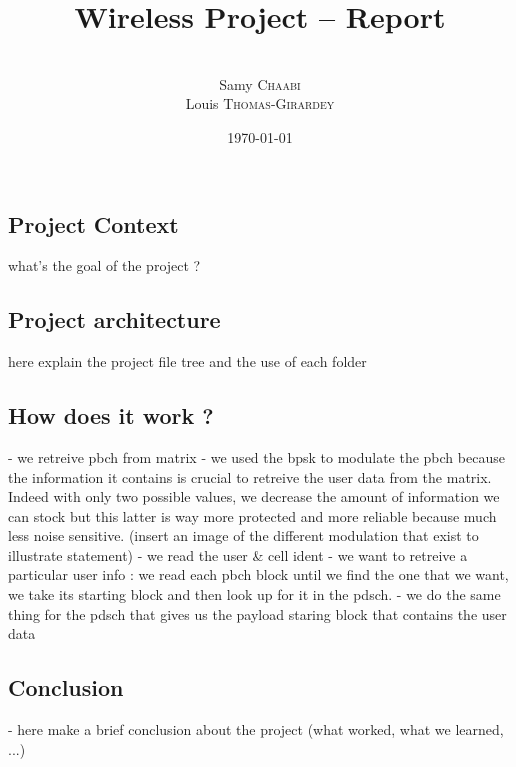 \documentclass[a4paper, 12pt, twoside]{article}
\title{Wireless Project -- Report}
\author{
    \\ Samy \textsc{Chaabi}
    \\ Louis \textsc{Thomas-Girardey}
}
\date{
    \today
    \\
    $\phantom{a}$
}
\begin{document}
    
    \maketitle

    \newpage
    
    \tableofcontents
    \listoffigures
    \listoftables
    \listofalgorithms
    \newpage


    \begin{indt}{\section{Project Context}} %
        what's the goal of the project ?
    \end{indt}

    \begin{indt}{\section{Project architecture}}
        here explain the project file tree and the use of each folder
    \end{indt}

    \begin{indt}{\section{How does it work ?}}
        - we retreive pbch from matrix
        - we used the bpsk to modulate the pbch because the information it contains is crucial to retreive the user data from the matrix. Indeed with only two possible values, we decrease the amount of information we can stock but this latter is way more protected and more reliable because much less noise sensitive. (insert an image of the different modulation that exist to illustrate statement)
        - we read the user & cell ident
        - we want to retreive a particular user info : we read each pbch block until we find the one that we want, we take its starting block and then look up for it in the pdsch.
        - we do the same thing for the pdsch that gives us the payload staring block that contains the user data
    \end{indt}

    \begin{indt}{\section{Conclusion}}
        - here make a brief conclusion about the project (what worked, what we learned, ...)
    \end{indt}
    
\end{document}
